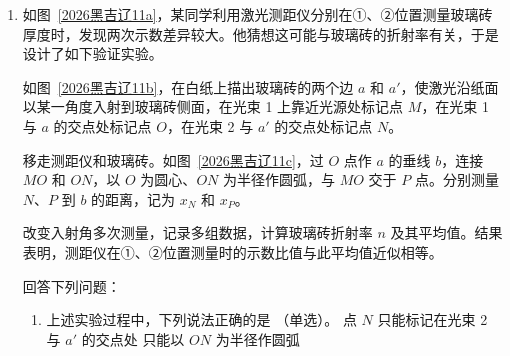 \documentclass[\gkver]{gaokaozhenti}
\begin{document}
\begin{enumerate}
{线框 $MN$ 离开磁场 Ⅱ 过程中，根据动量定理
\[ -2B\overline{i_{3}}L\cdot t_{3}=m\cdot\Delta v_{3} \]
又 $\overline{i_{3}}=\frac{2BL^{2}}{t_{3}R}$，可得 $\Delta v_{3}=-\frac{4B^{2}L^{3}}{mR}$。

线框 $MN$ 穿过磁场 Ⅰ、Ⅱ 过程，线框 $MN$ 速度变化量
\[ \Delta v=\Delta v_{1}+\Delta v_{2}+\Delta v_{3}=-\frac{14B^{2}L^{3}}{mR} \]
根据 $v'-v_{0}=\Delta v$，可得线框 $MN$ 与右侧挡板碰撞前的速度大小为 $v'=\frac{2012B^{2}L^{3}}{mR}$。根据题意线框与挡板的碰撞均为弹性碰撞，可知 $MN$ 与右侧挡板首次碰撞后瞬间线框的速度大小
\[ v=v'=\frac{2012B^{2}L^{3}}{mR} \]
故 C 正确；

D．根据 C 选项分析可知线框完整穿过一次磁场 Ⅰ、Ⅱ，线框 $MN$ 速度变化量为 $\Delta v=-\frac{14B^{2}L^{3}}{mR}$。根据计算可知线框 $MN$ 完整穿过磁场 Ⅰ、Ⅱ 144 次后，速度为 $v''=v_{0}+144\Delta v=\frac{10B^{2}L^{3}}{mR}$。又 144 为偶数，可知线框 $MN$ 第 145 次由左侧进入磁场 Ⅰ，刚好完全进入磁场 Ⅱ 时，速度变化量为
\[ \Delta v'=-\left(\frac{B^{2}L^{3}}{mR}+\frac{9B^{2}L^{3}}{mR}\right)=-\frac{10B^{2}L^{3}}{mR} \]
可知线框 $MN$ 恰好停在磁场 Ⅱ 区域，穿过线框的磁通量为 $\Phi=2BL^{2}$，故 D 错误。

故选 AC。
}
\item
如图~\ref{2026黑吉辽11a}，某同学利用激光测距仪分别在①、②位置测量玻璃砖厚度时，发现两次示数差异较大。他猜想这可能与玻璃砖的折射率有关，于是设计了如下验证实验。

如图~\ref{2026黑吉辽11b}，在白纸上描出玻璃砖的两个边 $a$ 和 $a'$，使激光沿纸面以某一角度入射到玻璃砖侧面，在光束 1 上靠近光源处标记点 $M$，在光束 1 与 $a$ 的交点处标记点 $O$，在光束 2 与 $a'$ 的交点处标记点 $N$。

移走测距仪和玻璃砖。如图~\ref{2026黑吉辽11c}，过 $O$ 点作 $a$ 的垂线 $b$，连接 $MO$ 和 $ON$，以 $O$ 为圆心、$ON$ 为半径作圆弧，与 $MO$ 交于 $P$ 点。分别测量 $N$、$P$ 到 $b$ 的距离，记为 $x_{N}$ 和 $x_{P}$。

改变入射角多次测量，记录多组数据，计算玻璃砖折射率 $n$ 及其平均值。结果表明，测距仪在①、②位置测量时的示数比值与此平均值近似相等。

回答下列问题：
\begin{enumerate}
	\item
	上述实验过程中，下列说法正确的是 （单选）。
	{点 $N$ 只能标记在光束 2 与 $a'$ 的交点处}
	{只能以 $ON$ 为半径作圆弧}


\end{enumerate}
\end{enumerate}
\end{document}
